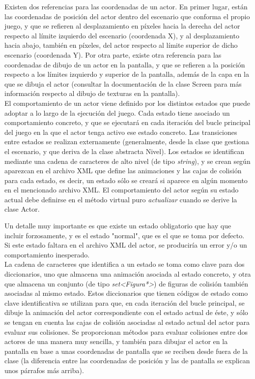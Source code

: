 Existen dos referencias para las coordenadas de un actor. En primer lugar, están las coordenadas de posición del actor dentro del escenario que conforma el propio juego, y que se refieren al desplazamiento en píxeles hacia la derecha del actor respecto al límite izquierdo del escenario (coordenada X), y al desplazamiento hacia abajo, también en píxeles, del actor respecto al límite superior de dicho escenario (coordenada Y). Por otra parte, existe otra referencia para las coordenadas de dibujo de un actor en la pantalla, y que se refieren a la posición respecto a los límites izquierdo y superior de la pantalla, además de la capa en la que se dibuja el actor (consultar la documentación de la clase Screen para más información respecto al dibujo de texturas en la pantalla).\\

El comportamiento de un actor viene definido por los distintos estados que puede adoptar a lo largo de la ejecución del juego. Cada estado tiene asociado un comportamiento concreto, y que se ejecutará en cada iteración del bucle principal del juego en la que el actor tenga activo ese estado concreto. Las transiciones entre estados se realizan externamente (generalmente, desde la clase que gestiona el escenario, y que deriva de la clase abstracta Nivel). Los estados se identifican mediante una cadena de caracteres de alto nivel (de tipo \emph{string}), y se crean según aparezcan en el archivo XML que define las animaciones y las cajas de colisión para cada estado, es decir, un estado sólo se creará si aparece en algún momento en el mencionado archivo XML. El comportamiento del actor según su estado actual debe definirse en el método virtual puro \emph{actualizar} cuando se derive la clase Actor.

Un detalle muy importante es que existe un estado obligatorio que hay que incluir forzosamente, y es el estado "normal", que es el que se toma por defecto. Si este estado faltara en el archivo XML del actor, se produciría un error y/o un comportamiento inesperado.\\

La cadena de caracteres que identifica a un estado se toma como clave para dos diccionarios, uno que almacena una animación asociada al estado concreto, y otra que almacena un conjunto (de tipo \emph{set<Figura*>}) de figuras de colisión también asociadas al mismo estado. Estos diccionarios que tienen códigos de estado como clave identificativa se utilizan para que, en cada iteración del bucle principal, se dibuje la animación del actor correspondiente con el estado actual de éste, y sólo se tengan en cuenta las cajas de colisión asociadas al estado actual del actor para evaluar sus colisiones. Se proporcionan métodos para evaluar colisiones entre dos actores de una manera muy sencilla, y también para dibujar el actor en la pantalla en base a unas coordenadas de pantalla que se reciben desde fuera de la clase (la diferencia entre las coordenadas de posición y las de pantalla se explican unos párrafos más arriba).\\

